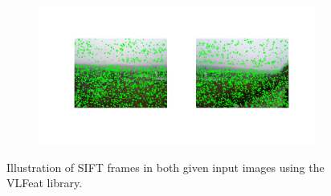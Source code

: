 \documentclass{paper}
\begin{document}
\begin{figure}[H]
    \centering
    \begin{subfigure}{1.0\textwidth}
        \includegraphics[width=\textwidth]{stitching/sift_frames_input_1}
    \end{subfigure}
    
    \caption{Illustration of SIFT frames in both given input images using the VLFeat library.}
    \label{fig:stitching_sift}       
\end{figure}
\end{document}
